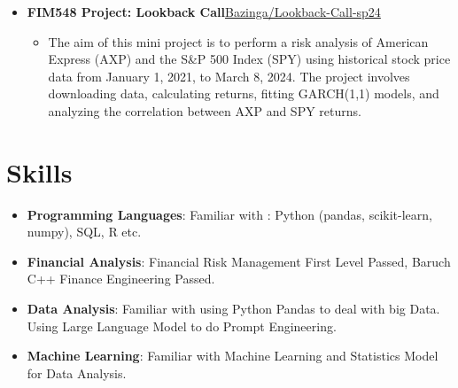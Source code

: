 \documentclass{resume}
\newcommand{\en}[1]{#1}
\newcommand{\zh}[1]{}
\begin{document}
\begin{itemize}[parsep=0.25ex]
            \item \en{{\textbf{FIM548 Project: Lookback Call}}\href{https://github.com/Bazinga-0411/FIM548-sp24-hw3}{Bazinga/Lookback-Call-sp24}}           
            \begin{itemize}
            \item The aim of this mini project is to perform a risk analysis of American Express (AXP) and the S\&P 500 Index (SPY) using historical stock price data from January 1, 2021, to March 8, 2024. The project involves downloading data, calculating returns, fitting GARCH(1,1) models, and analyzing the correlation between AXP and SPY returns.
            \end{itemize}
\end{itemize}

\section{\en{Skills}\zh{技能}}
\begin{itemize}[parsep=0.25ex]
      \item \en{\textbf{Programming Languages}:
                  Familiar with : Python (pandas, scikit-learn, numpy), SQL, R etc.}
      \item \en{\textbf{Financial Analysis}:
                  Financial Risk Management First Level Passed, Baruch C++ Finance Engineering Passed.}

      \item \en{\textbf{Data Analysis}: Familiar with using Python Pandas to deal with big Data. Using Large Language Model to do Prompt Engineering.}

      \item \en{\textbf{Machine Learning}:
            Familiar with Machine Learning and Statistics Model for Data Analysis.}
            \zh{\textbf{机器学习}:
                  熟悉经典机器学习算法。}
           

\end{itemize}

           
           
\end{document}

